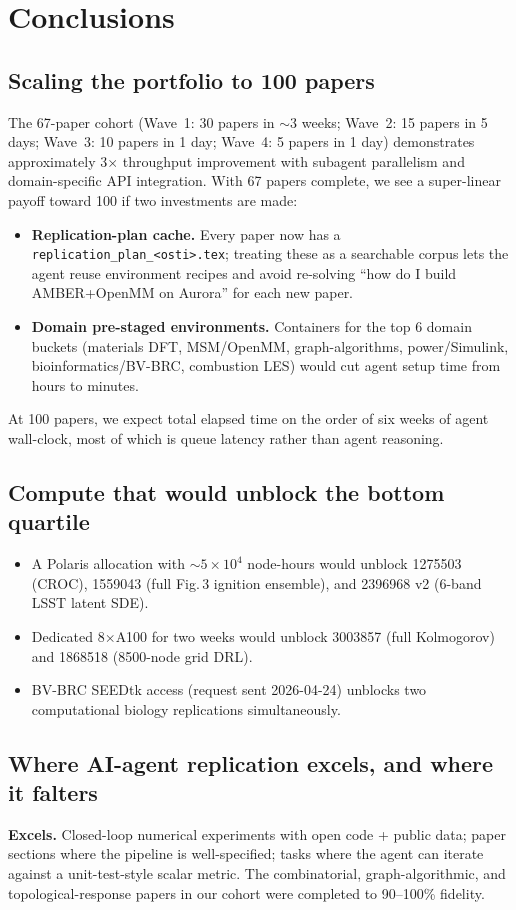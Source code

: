\section{Conclusions}\label{sec:conclusions}

\subsection{Scaling the portfolio to 100 papers}
The 67-paper cohort (Wave~1: 30 papers in $\sim$3 weeks; Wave~2: 15 papers
in 5 days; Wave~3: 10 papers in 1 day; Wave~4: 5 papers in 1 day)
demonstrates approximately 3$\times$ throughput improvement with subagent
parallelism and domain-specific API integration. With 67 papers complete,
we see a super-linear payoff toward 100 if two investments are made:
\begin{itemize}
\item \textbf{Replication-plan cache.} Every paper now has a
\texttt{replication\_plan\_<osti>.tex}; treating these as a searchable corpus
lets the agent reuse environment recipes and avoid re-solving ``how do I build
AMBER+OpenMM on Aurora'' for each new paper.
\item \textbf{Domain pre-staged environments.} Containers for the top 6 domain
buckets (materials DFT, MSM/OpenMM, graph-algorithms, power/Simulink,
bioinformatics/BV-BRC, combustion LES) would cut agent setup time from hours
to minutes.
\end{itemize}
At 100 papers, we expect total elapsed time on the order of six weeks of agent
wall-clock, most of which is queue latency rather than agent reasoning.

\subsection{Compute that would unblock the bottom quartile}
\begin{itemize}
\item A Polaris allocation with $\sim 5\times 10^4$ node-hours would unblock
1275503 (CROC), 1559043 (full Fig.\,3 ignition ensemble), and 2396968 v2
(6-band LSST latent SDE).
\item Dedicated 8$\times$A100 for two weeks would unblock 3003857
(full Kolmogorov) and 1868518 (8500-node grid DRL).
\item BV-BRC SEEDtk access (request sent 2026-04-24) unblocks two
computational biology replications simultaneously.
\end{itemize}

\subsection{Where AI-agent replication excels, and where it falters}
\textbf{Excels.} Closed-loop numerical experiments with open code + public
data; paper sections where the pipeline is well-specified; tasks where
the agent can iterate against a unit-test-style scalar metric. The
combinatorial, graph-algorithmic, and topological-response papers in our
cohort were completed to 90--100\% fidelity.

